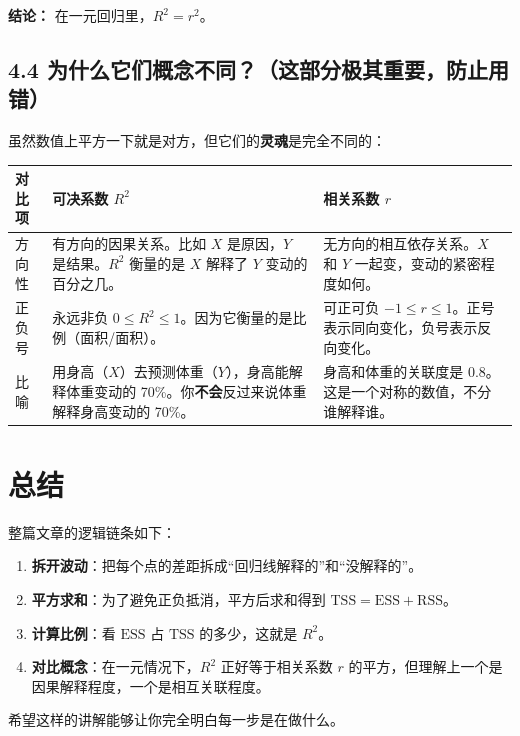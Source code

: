 \documentclass[12pt,a4paper]{article}
\begin{document}
\textbf{结论：} 在一元回归里，\(R^2 = r^2\)。

\subsection*{4.4 为什么它们概念不同？（这部分极其重要，防止用错）}

虽然数值上平方一下就是对方，但它们的\textbf{灵魂}是完全不同的：

\begin{table}[h]
    \centering
    \renewcommand{\arraystretch}{1.3}
    \begin{tabular}{p{2.2cm}<{\centering} p{5.5cm} p{5.5cm}}
        \toprule
        \textbf{对比项} & \textbf{可决系数 \(R^2\)} & \textbf{相关系数 \(r\)} \\
        \midrule
        方向性 & 有方向的因果关系。比如 \(X\) 是原因，\(Y\) 是结果。\(R^2\) 衡量的是 \(X\) 解释了 \(Y\) 变动的百分之几。 & 无方向的相互依存关系。\(X\) 和 \(Y\) 一起变，变动的紧密程度如何。 \\
        \midrule
        正负号 & 永远非负 \(0 \leq R^2 \leq 1\)。因为它衡量的是比例（面积/面积）。 & 可正可负 \(-1 \leq r \leq 1\)。正号表示同向变化，负号表示反向变化。 \\
        \midrule
        比喻 & 用身高（\(X\)）去预测体重（\(Y\)），身高能解释体重变动的 70\%。你\textbf{不会}反过来说体重解释身高变动的 70\%。 & 身高和体重的关联度是 0.8。这是一个对称的数值，不分谁解释谁。 \\
        \bottomrule
    \end{tabular}
\end{table}

\section*{总结}

整篇文章的逻辑链条如下：
\begin{enumerate}[itemsep=0pt,topsep=0pt]
    \item \textbf{拆开波动}：把每个点的差距拆成“回归线解释的”和“没解释的”。
    \item \textbf{平方求和}：为了避免正负抵消，平方后求和得到 \(\mathrm{TSS} = \mathrm{ESS} + \mathrm{RSS}\)。
    \item \textbf{计算比例}：看 \(\mathrm{ESS}\) 占 \(\mathrm{TSS}\) 的多少，这就是 \textbf{\(R^2\)}。
    \item \textbf{对比概念}：在一元情况下，\(R^2\) 正好等于相关系数 \(r\) 的平方，但理解上一个是因果解释程度，一个是相互关联程度。
\end{enumerate}

希望这样的讲解能够让你完全明白每一步是在做什么。
\end{document}
